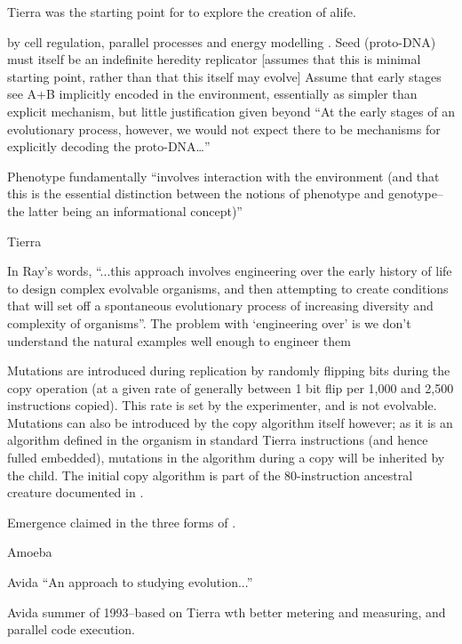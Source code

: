 \begin{NOTES}
Tierra was the starting point for \cite{Taylor2001, Taylor:1999sc} to explore the creation of \gls{alife}.

 by cell regulation, parallel processes and energy modelling \cite[p.4]{Taylor:1999sc}.
Seed (proto-DNA) must itself be an indefinite heredity replicator {[}assumes that this is minimal starting point, rather than that this itself may evolve{]} \parencite{Taylor2001}
Assume that early stages see A+B implicitly encoded in the environment, essentially as simpler than explicit mechanism, but little justification given beyond ``At the early stages of an evolutionary process, however, we would not expect there to be mechanisms for explicitly decoding the proto-DNA\ldots{}'' \parencite{Taylor2001}

Phenotype fundamentally ``involves interaction with the environment (and that this is the essential distinction between the notions of phenotype and genotype--the latter being an informational concept)'' \parencite{Taylor2001}

Tierra \parencite{Ray1991}

In Ray's words, ``...this approach involves engineering over the early history of life to design complex evolvable organisms, and then attempting to create conditions that will set off a spontaneous evolutionary process of increasing diversity and complexity of organisms''\parencite{Taylor2001}. The problem with `engineering over' is we don't understand the natural examples well enough to engineer them \parencite{Taylor2001}

Mutations are introduced during replication by randomly flipping bits during the copy operation (at a given rate of generally between 1 bit flip per 1,000 and 2,500 instructions copied). This rate is set by the experimenter, and is not evolvable. Mutations can also be introduced by the copy algorithm itself however; as it is an algorithm defined in the organism in standard Tierra instructions (and hence fulled embedded), mutations in the algorithm during a copy will be inherited by the child. The initial copy algorithm is part of the 80-instruction ancestral creature documented in \cite[app.C]{Ray1991}.

Emergence claimed in the three forms of \cite{Cariani1991}.

Amoeba \cite{Pargellis2001}

Avida \parencite{Ofria2004}
``An approach to studying evolution...''

Avida summer of 1993--based on Tierra wth better metering and measuring, and parallel code execution.


\end{NOTES}
